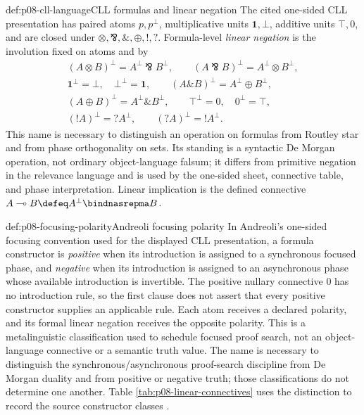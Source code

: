 \begin{hbdefinition}{def:p08-cll-language}{CLL formulas and linear negation}
The cited one-sided CLL presentation has paired atoms
\(p,p^\perp\), multiplicative units \(\mathbf 1,\bot\), additive units
\(\top,0\), and are closed under
\(\otimes,\bindnasrepma,\mathbin{\&},\oplus,!,?\).  Formula-level
\emph{linear negation} is the involution fixed on atoms and by
\[
\begin{gathered}
 (A\otimes B)^\perp=A^\perp\bindnasrepma B^\perp,
 \qquad
 (A\bindnasrepma B)^\perp=A^\perp\otimes B^\perp,\\
 \mathbf 1^\perp=\bot,\quad \bot^\perp=\mathbf 1,\qquad
 (A\mathbin{\&}B)^\perp=A^\perp\oplus B^\perp,\\
 (A\oplus B)^\perp=A^\perp\mathbin{\&}B^\perp,
 \qquad \top^\perp=0,\quad 0^\perp=\top,\\
 (!A)^\perp=?A^\perp,\qquad(?A)^\perp=!A^\perp.
\end{gathered}
\]
This name is necessary to distinguish an operation on formulas from Routley
star and from phase orthogonality on sets.  Its standing is a syntactic De
Morgan operation, not ordinary object-language falsum; it differs from
primitive negation in the relevance language and is used by the one-sided
sheet, connective table, and phase interpretation.  Linear implication is the
defined connective \(A\multimap B\defeq A^\perp\bindnasrepma B\).
\end{hbdefinition}

\begin{hbdefinition}{def:p08-focusing-polarity}{Andreoli focusing polarity}
In Andreoli's one-sided focusing convention used for the displayed CLL
presentation, a formula constructor is
\emph{positive} when its introduction is assigned to a synchronous focused
phase, and \emph{negative} when its introduction is assigned to an
asynchronous phase whose available introduction is invertible.  The positive
nullary connective \(0\) has no introduction rule, so the first clause does
not assert that every positive constructor supplies an applicable rule.  Each
atom receives a declared polarity, and its formal linear negation receives the
opposite polarity.  This is a metalinguistic classification used to schedule
focused proof search, not an object-language connective or a semantic truth
value.  The name is necessary to distinguish the synchronous/asynchronous
proof-search discipline from De Morgan duality and from positive or negative
truth; those classifications do not determine one another.  Table
\ref{tab:p08-linear-connectives} uses the distinction to record the source
constructor classes \cite{Andreoli1992}.
\end{hbdefinition}

